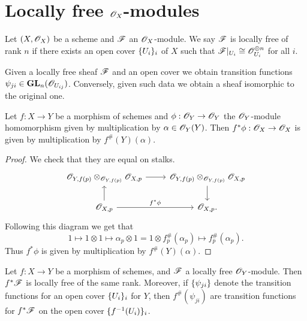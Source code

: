 \documentclass{memoir}
\begin{document}
\section{Locally free \texorpdfstring{$\mathscr{O}_X$}{OX}-modules}
\begin{definition}
    Let $(X,\mathscr{O}_X)$ be a scheme and $\mathscr{F}$ an $\mathscr{O}_X$-module.
    We say $\mathscr{F}$ is locally free of rank $n$ if there exists an open cover $\lbrace U_i\rbrace_i$ of $X$ such that $\mathscr{F}|_{U_i} \cong \mathscr{O}_{U_i}^{\oplus n}$ for all $i$.
\end{definition}
\begin{remark}
    Given a locally free sheaf $\mathscr{F}$ and an open cover we obtain transition functions $\psi_{ji}\in \mathbf{GL}_n(\mathscr{O}_{U_{ij}})$.
    Conversely, given such data we obtain a sheaf isomorphic to the original one.
\end{remark}
\begin{lemma}
    \label{lem:pullback}
    Let $f:X\to Y$ be a morphism of schemes and $\phi:\mathscr{O}_Y\to \mathscr{O}_Y$ the $\mathscr{O}_Y$-module homomorphism given by multiplication by $\alpha\in\mathscr{O}_Y(Y)$.
    Then $f^*\phi:\mathscr{O}_X\to \mathscr{O}_X$ is given by multiplication by $f^\#(Y)(\alpha)$.
\end{lemma}
\begin{proof}
    We check that they are equal on stalks.
    \begin{equation}
        \begin{tikzcd}
            \shf O_{Y,f(p)}\otimes_{\shf O_{Y,f(p)}}\shf O_{X,p} \arrow[r] & \shf O_{Y,f(p)}\otimes_{\shf O_{Y,f(p)}}\shf O_{X,p} \arrow[d] \\
            \shf O_{X,p} \arrow[r,"f^*\phi"] \arrow[u] & \shf O_{X,p}.
        \end{tikzcd}
    \end{equation}
    Following this diagram we get that 
    \begin{equation}
        1\mapsto 1\otimes 1\mapsto \alpha_p\otimes 1 = 1\otimes f_p^\#(\alpha_p)\mapsto f_p^\#(\alpha_p).
    \end{equation}
    Thus $f^*\phi$ is given by multiplication by $f^\#(Y)(\alpha)$.
\end{proof}
\begin{thm}
    Let $f:X\to Y$ be a morphism of schemes, and $\mathscr{F}$ a locally free $\mathscr{O}_Y$-module.
    Then $f^*\mathscr{F}$ is locally free of the same rank.
    Moreover, if $\lbrace\psi_{ji}\rbrace$ denote the transition functions for an open cover $\lbrace U_i\rbrace_i$ for $Y$, then $f^\#(\psi_{ji})$ are transition functions for $f^*\mathscr{F}$ on the open cover $\lbrace f^{-1}(U_i)\rbrace_i$.
\end{thm}
\end{document}
